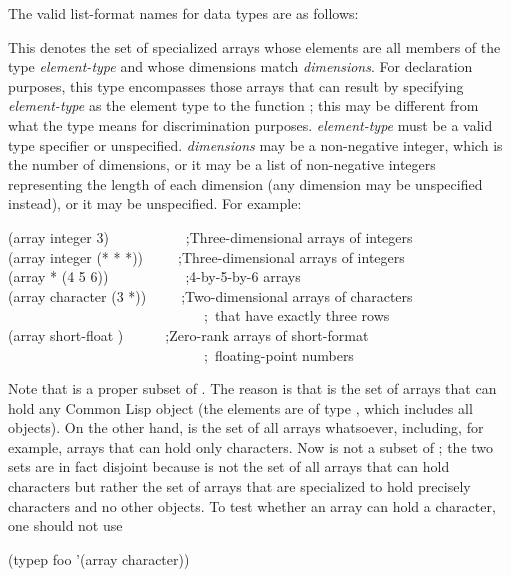 The valid list-format names for data types are as follows:
\begin{flushdesc}
\item[\cd{(array {\it element-type} {\it dimensions})}]
This denotes the set
of specialized arrays
whose elements are all members of the type {\it element-type}
and whose dimensions match {\it dimensions}.
For declaration purposes, this type encompasses those arrays
that can result by specifying {\it element-type} as the element type
to the function ; this may be different
from what the type means for discrimination purposes.
{\it element-type} must be a valid type specifier or unspecified.
{\it dimensions} may be a non-negative integer, which is the number
of dimensions, or it may be a list of non-negative integers
representing the length of each dimension (any dimension
may be unspecified instead), or it may be unspecified.
For example:
\begin{lisp}
(array integer 3)~~~~~~~~~~~;{\rm Three-dimensional arrays of integers} \\
(array integer (* * *))~~~~~;{\rm Three-dimensional arrays of integers} \\
(array * (4 5 6))~~~~~~~~~~~;{\rm 4-by-5-by-6 arrays} \\
(array character (3 *))~~~~~;{\rm Two-dimensional arrays of characters} \\
~~~~~~~~~~~~~~~~~~~~~~~~~~~~;~{\rm that have exactly three rows} \\
(array short-float {\emptylist})~~~~~~;{\rm Zero-rank arrays of short-format} \\
~~~~~~~~~~~~~~~~~~~~~~~~~~~~;~{\rm floating-point numbers}
\end{lisp}
Note that  is a proper subset of .
The reason is that  is the set of arrays that can
hold any Common Lisp object (the elements are of type ,
which includes all objects).  On the other hand, 
is the set of all arrays whatsoever, including, for example,
arrays that can hold only characters.  Now
 is not a subset of ; the two sets
are in fact disjoint because  is not the
set of all arrays that can hold characters but rather the set of
arrays that are specialized to hold precisely characters and no
other objects.  To test whether an array  can hold a character,
one should not use
\begin{lisp}
(typep foo '(array character))
\end{lisp}

\end{flushdesc}

